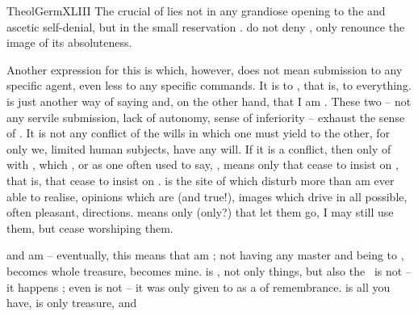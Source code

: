 \citet{Behold, in such a man must all thought of Self, all self-seeking,
self-will, and what cometh thereof, be utterly lost and surrendered and
given over to God, except in so far as they are necessary to make up a
person.}{TheolGerm}{XLIII} The crucial  of  lies
not in any grandiose opening to the  and ascetic self-denial, but in
the small reservation .  do not deny
,  only renounce the image of its absoluteness. 

\pa Another expression for this is  which,
however, does not mean submission to any specific agent, even less to any
specific commands. It is  to , that is, to everything.
 is just another way of saying  and,
on the other hand, that I am . These two -- not any servile
submission, lack of autonomy, sense of inferiority -- exhaust the sense of
. It is not any conflict of the wills in which one must
yield to the other, for only we, limited human subjects, have any will.  If it
is a conflict, then only of  with , which  , or as one often used to say,
, means only that  cease to insist on
, that is, that  cease to insist on .   
 is the site of  which disturb more than  am ever
able to realise, opinions which are  (and true!), images which drive
 in all possible, often pleasant, directions.  means
only (only?) that  let them go, I may still use them, but  cease
worshiping them.
  
 and  am  -- eventually, this means
that  am ; not having any master and being  to
,  becomes  whole treasure, 
becomes mine.   is , not only things, but also the \sch\ is
not  -- it happens ; even 
 is not  -- it was only given to  as a  of
remembrance. 
 is all you have, is  only treasure, and 

